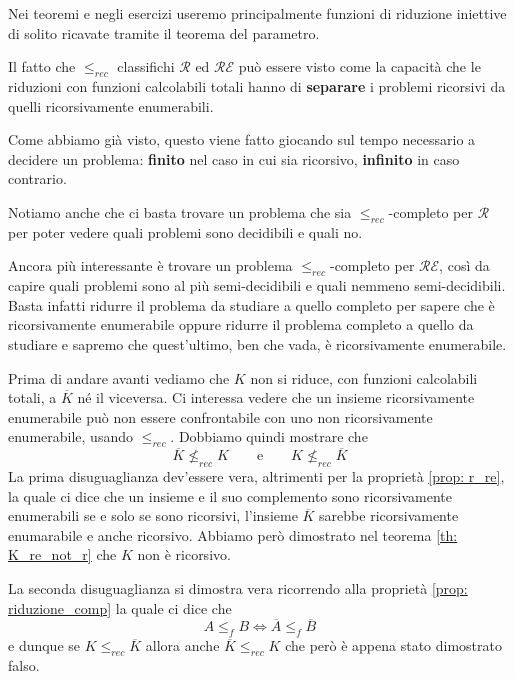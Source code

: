 Nei teoremi e negli esercizi useremo principalmente funzioni
di riduzione iniettive di solito ricavate tramite il teorema
del parametro.

Il fatto che $\leq_{rec}$ classifichi $\mathcal{R}$ ed
$\mathcal{RE}$ può essere visto come la capacità che le
riduzioni con funzioni calcolabili totali hanno di
\textbf{separare} i problemi ricorsivi da quelli ricorsivamente
enumerabili.

Come abbiamo già visto, questo viene fatto giocando sul tempo
necessario a decidere un problema: \textbf{finito} nel caso
in cui sia ricorsivo, \textbf{infinito} in caso contrario.

Notiamo anche che ci basta trovare un problema che sia
$\leq_{rec}$-completo per $\mathcal{R}$ per poter vedere quali
problemi sono decidibili e quali no.

Ancora più interessante è trovare un problema
$\leq_{rec}$-completo per $\mathcal{RE}$, così da capire quali
problemi sono al più semi-decidibili e quali nemmeno
semi-decidibili. Basta infatti ridurre il problema da studiare a
quello completo per sapere che è ricorsivamente enumerabile
oppure ridurre il problema completo a quello da studiare e
sapremo che quest'ultimo, ben che vada, è ricorsivamente
enumerabile.

Prima di andare avanti vediamo che $K$ non si riduce, con
funzioni calcolabili totali, a $\overline{K}$ né il viceversa.
Ci interessa vedere che un insieme ricorsivamente enumerabile
può non essere confrontabile con uno non ricorsivamente
enumerabile, usando $\leq_{rec}$. Dobbiamo quindi mostrare che
\[
	\overline{K} \not\leq_{rec} K \qquad \text{e}
	\qquad K \not\leq_{rec} \overline{K}
\]
La prima disuguaglianza dev'essere vera, altrimenti per la
proprietà \ref{prop: r_re}, la quale ci dice che un insieme e
il suo complemento sono ricorsivamente enumerabili se e solo se
sono ricorsivi, l'insieme $\overline{K}$ sarebbe ricorsivamente
enumarabile e anche ricorsivo. Abbiamo però dimostrato nel
teorema \ref{th: K_re_not_r} che $K$ non è ricorsivo.

La seconda disuguaglianza si dimostra vera ricorrendo alla
proprietà \ref{prop: riduzione_comp} la quale ci dice che
\[ A \leq_f B \iff \overline{A} \leq_f \overline{B} \]
e dunque se $K \leq_{rec} \overline{K}$ allora anche
$\overline{K} \leq_{rec} K$ che però è appena stato dimostrato
falso.

